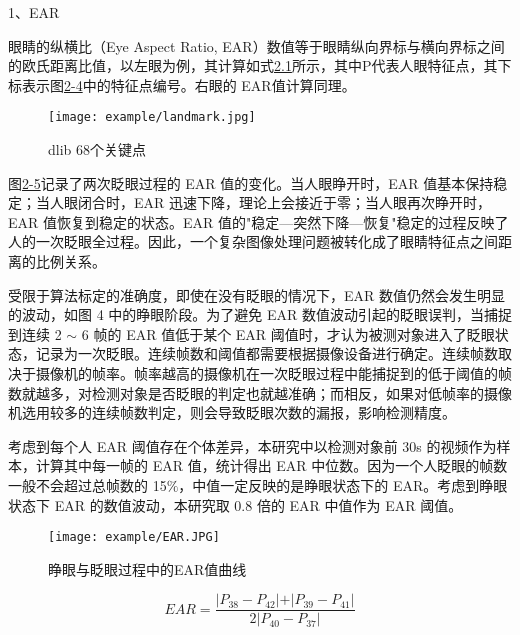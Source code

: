 1、EAR

眼睛的纵横比（Eye Aspect Ratio, EAR）数值等于眼睛纵向界标与横向界标之间的欧氏距离比值，以左眼为例，其计算如式\href{2.1}{2.1}所示，其中P代表人眼特征点，其下标表示图\href{2-4}{2-4}中的特征点编号。右眼的 EAR值计算同理。

\begin{figure}[!htp]

\centering
\texttt{[image: example/landmark.jpg]}
\caption{dlib 68个关键点}
\label{table:2-4}

\end{figure}

图\href{2-5}{2-5}记录了两次眨眼过程的 EAR 值的变化。当人眼睁开时，EAR 值基本保持稳定；当人眼闭合时，EAR 迅速下降，理论上会接近于零；当人眼再次睁开时，EAR 值恢复到稳定的状态。EAR 值的"稳定—突然下降—恢复"稳定的过程反映了人的一次眨眼全过程。因此，一个复杂图像处理问题被转化成了眼睛特征点之间距离的比例关系。

受限于算法标定的准确度，即使在没有眨眼的情况下，EAR 数值仍然会发生明显的波动，如图 4 中的睁眼阶段。为了避免 EAR 数值波动引起的眨眼误判，当捕捉到连续 2 $\sim$ 6 帧的 EAR 值低于某个 EAR 阈值时，才认为被测对象进入了眨眼状态，记录为一次眨眼。连续帧数和阈值都需要根据摄像设备进行确定。连续帧数取决于摄像机的帧率。帧率越高的摄像机在一次眨眼过程中能捕捉到的低于阈值的帧数就越多，对检测对象是否眨眼的判定也就越准确；而相反，如果对低帧率的摄像机选用较多的连续帧数判定，则会导致眨眼次数的漏报，影响检测精度。

考虑到每个人 EAR 阈值存在个体差异，本研究中以检测对象前 $30$s 的视频作为样本，计算其中每一帧的 EAR 值，统计得出 EAR 中位数。因为一个人眨眼的帧数一般不会超过总帧数的 15$\%$，中值一定反映的是睁眼状态下的 EAR。考虑到睁眼状态下 EAR 的数值波动，本研究取 $0.8$ 倍的 EAR 中值作为 EAR 阈值。

\begin{figure}[!htp]

\centering
\texttt{[image: example/EAR.JPG]}
\caption{睁眼与眨眼过程中的EAR值曲线}
\label{table:2-6}

\end{figure}

\begin{equation}
EAR = \frac{\vert P_{38} - P_{42} \vert + \vert P_{39} - P_{41} \vert}{2 \vert P_{40} - P_{37}\vert}
\end{equation}

